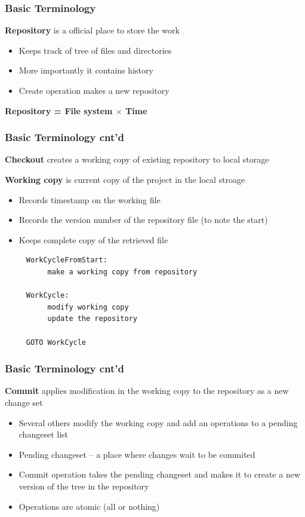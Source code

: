 \documentclass[newPxFont,sthlmFooter,nooffset]{beamer}
\begin{document}
\begin{frame}[t]
  \frametitle{Basic Terminology}
\textbf{Repository} is a official place to store the work
\begin{itemize}
\item Keeps track of tree of files and directories
\item More importantly it contains history
\item Create operation makes a new repository
\end{itemize}
\bigskip

\begin{center}
  \textbf{Repository = File system $\times$ Time}
\end{center}

\end{frame}



\begin{frame}[fragile,t]
  \frametitle{Basic Terminology cnt'd}
\textbf{Checkout} creates a working copy of existing repository to local storage

\textbf{Working copy} is current copy of the project in the local stroage

\begin{itemize}
\item Records timestamp on the working file
\item Records the version number of the repository file (to note the
  start)
\item Keeps complete copy of the retrieved file
\end{itemize}

\begin{verbatim}
     WorkCycleFromStart:
          make a working copy from repository

     WorkCycle:
          modify working copy
          update the repository

     GOTO WorkCycle
\end{verbatim}


\end{frame}


\begin{frame}[t]
  \frametitle{Basic Terminology cnt'd}
\textbf{Commit} applies modification in the working copy to the repository as a new change set

\begin{itemize}
\item Several others modify the working copy and add an operations to a pending changeset list
\item Pending changeset – a place where changes wait to be commited
\item Commit operation takes the pending changeset and makes it to create a new version of the tree in the repository
\item Operations are atomic (all or nothing)
\end{itemize}


\end{frame}
\end{document}
